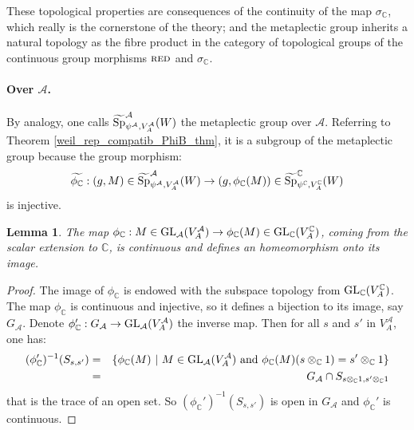 \documentclass[11pt]{article}
\theoremstyle{plain}
\newtheorem{lem}[theo]{Lemma}
\theoremstyle{definition}
\theoremstyle{plain}
\theoremstyle{definition}
\theoremstyle{plain}
\begin{document}
These topological properties are consequences of the continuity of the map $\sigma_\mathbb{C}$, which really is the cornerstone of the theory; and the metaplectic group inherits a natural topology as the fibre product in the category of topological groups of the continuous group morphisms $\textup{\textsc{red}}$ and $\sigma_\mathbb{C}$.

\paragraph{Over $\mathcal{A}$.} By analogy, one calls $\widetilde{\textup{Sp}}_{\psi^\mathcal{A},V_A^\mathcal{A}}^\mathcal{A}(W)$ the metaplectic group over $\mathcal{A}$. Referring to Theorem \ref{weil_rep_compatib_PhiB_thm}, it is a subgroup of the metaplectic group because the group morphism:
$$\widetilde{\phi_\mathbb{C}} : (g,M) \in \widetilde{\textup{Sp}}_{\psi^\mathcal{A},V_A^\mathcal{A}}^\mathcal{A}(W) \to (g,\phi_\mathbb{C}(M)) \in \widetilde{\textup{Sp}}_{\psi^\mathbb{C},V_A^\mathbb{C}}^\mathbb{C}(W)$$
is injective. 

\begin{lem} \label{map_phiC_homeo_lem} The map $\phi_\mathbb{C} : M \in \textup{GL}_\mathcal{A}(V_A^\mathcal{A}) \to \phi_\mathbb{C} (M) \in \textup{GL}_\mathbb{C}(V_A^\mathbb{C})$, coming from the scalar extension to $\mathbb{C}$, is continuous and defines an homeomorphism onto its image. \end{lem}

\begin{proof} The image of $\phi_\mathbb{C}$ is endowed with the subspace topology from $\textup{GL}_\mathbb{C}(V_A^\mathbb{C})$. The map $\phi_\mathbb{C}$ is continuous and injective, so it defines a bijection to its image, say $G_\mathcal{A}$. Denote $\phi_\mathbb{C}' : G_\mathcal{A} \to \textup{GL}_\mathcal{A}(V_A^\mathcal{A})$ the inverse map. Then for all $s$ and $s'$ in $V_A^\mathcal{A}$, one has:
\begin{eqnarray*} (\phi_\mathbb{C}')^{-1} (S_{s,s'}) &=& \{ \phi_\mathbb{C} (M) \ | \ M \in \textup{GL}_\mathcal{A}(V_A^\mathcal{A}) \textup{ and } \phi_\mathbb{C}(M) (s \otimes_\mathbb{C}1)=s'\otimes_\mathbb{C} 1\} \\
 &=&  G_\mathcal{A} \cap S_{s\otimes_\mathbb{C}1,s'\otimes_\mathbb{C}1} \end{eqnarray*}
that is the trace of an open set. So $(\phi_\mathbb{C}')^{-1} (S_{s,s'})$ is open in $G_\mathcal{A}$ and $\phi_\mathbb{C}'$ is continuous. \end{proof}
\end{document}
